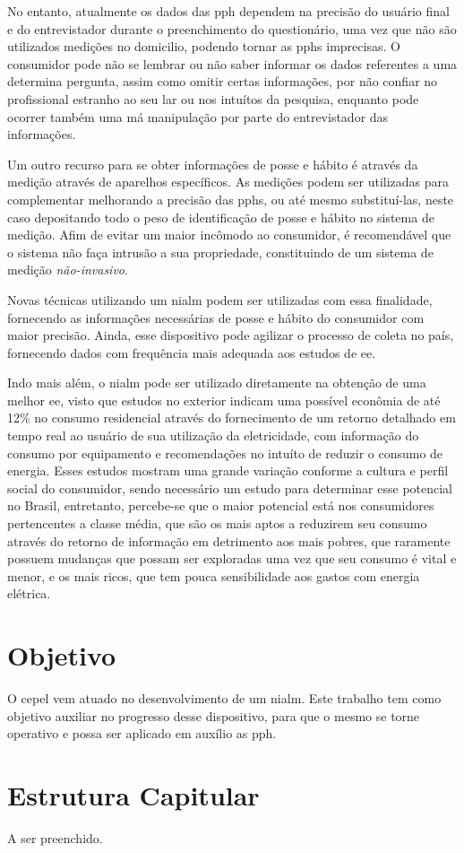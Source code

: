No entanto, atualmente os dados das \gls{pph} dependem
na precisão do usuário final e do entrevistador durante 
o preenchimento do questionário, uma vez que
não são utilizados medições no domicilio, podendo tornar as \glspl{pph}
imprecisas. O consumidor pode não se lembrar ou não saber informar os dados
referentes a uma determina pergunta, assim como omitir certas informações, 
por não confiar no profissional estranho ao seu lar ou nos intuítos da pesquisa,
enquanto pode ocorrer também uma má manipulação por parte do entrevistador das
informações.

Um outro recurso para se obter informações de posse e hábito é através da medição 
através de aparelhos específicos. As medições podem ser utilizadas para
complementar melhorando a precisão das \glspl{pph}, ou até mesmo substituí-las,
neste caso depositando todo o peso de identificação de posse e hábito no sistema de
medição. Afim de evitar um maior incômodo ao consumidor, é recomendável que o 
sistema não faça intrusão a sua propriedade, constituindo de um sistema de
medição \emph{não-invasivo}. 

Novas técnicas utilizando um \gls{nialm} podem ser utilizadas com essa finalidade, 
fornecendo as informações necessárias de posse e hábito do consumidor com
maior precisão. Ainda, esse dispositivo pode agilizar o processo de coleta no país,
fornecendo dados com frequência mais adequada aos estudos de \gls{ee}. 

Indo mais além, o \gls{nialm} pode ser utilizado diretamente na obtenção de 
uma melhor \gls{ee}, visto que estudos no exterior
\cite{2010_advanced_metering,liikkanen2009extreme,schleich2012does,darby2006effectiveness}
indicam uma possível econômia de até 12\% no consumo residencial através do fornecimento de um
retorno detalhado em tempo real ao usuário de sua utilização da eletricidade, 
com informação do consumo por equipamento e recomendações no intuíto de reduzir
o consumo de energia. Esses estudos mostram uma grande variação conforme a
cultura e perfil social do consumidor, sendo necessário um estudo para
determinar esse potencial no Brasil, entretanto, percebe-se que o maior
potencial está nos consumidores pertencentes a classe média, que são os mais aptos a reduzirem seu
consumo através do retorno de informação em detrimento aos mais pobres, que 
raramente possuem mudanças que possam ser exploradas uma vez que seu consumo
é vital e menor, e os mais ricos, que tem pouca sensibilidade aos gastos com
energia elétrica.

\section{Objetivo}

O \gls{cepel} vem atuado no desenvolvimento de um \gls{nialm}. Este trabalho
tem como objetivo auxiliar no progresso desse dispositivo, para que o
mesmo se torne operativo e possa ser aplicado em auxílio as \gls{pph}.

\section{Estrutura Capitular}

A ser preenchido.




